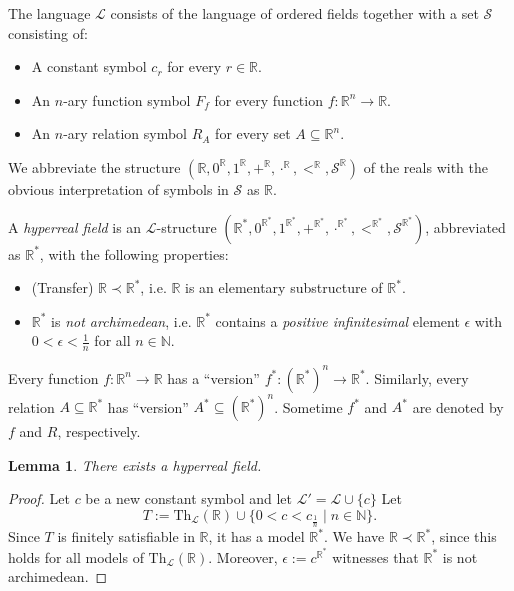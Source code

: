 \documentclass[a4paper, 11pt]{amsart}
\newtheorem{lemma}[lemma]{Lemma}
\theoremstyle{remark}
\newcommand{\NN}{\mathbb{N}}
\newcommand{\Th}{\mathrm{Th}}
\newcommand{\RR}{\mathbb{R}}
\newcommand{\cF}{\mathcal F}
\newcommand{\cL}{\mathcal L}
\newcommand{\cS}{\mathcal S}
\begin{document}

The language $\cL$ consists of the language of ordered fields together with a set $\cS$ consisting of: 

\begin{itemize} 
\item 
A constant symbol $c_r$ for every $r\in \RR$. 
\item 
An $n$-ary function symbol $F_f$ for every function $f\colon \RR^n \rightarrow \RR$. 
\item 
An $n$-ary relation symbol $R_A$ for every set $A\subseteq \RR^n$. 
\end{itemize} 

We abbreviate the structure 
$(\RR,0^{\RR},1^{\RR},+^{\RR},\cdot^{\RR},<^{\RR},\cS^{\RR})$ 
of the reals with the obvious interpretation of symbols in $\cS$ as $\RR$. 

A \emph{hyperreal field} is an $\cL$-structure $(\RR^*,0^{\RR^*},1^{\RR^*},+^{\RR^*},\cdot^{\RR^*},<^{\RR^*},\cS^{\RR^*})$, abbreviated as $\RR^*$, with the following properties: 

\begin{itemize} 
\item 
(Transfer) 
$\RR \prec \RR^*$, i.e. $\RR$ is an elementary substructure of $\RR^*$. 
\item 
$\RR^*$ is \emph{not archimedean}, i.e. $\RR^*$ contains a \emph{positive infinitesimal} element $\epsilon$ with $0<\epsilon < \frac{1}{n}$ for all $n\in\NN$. 
\end{itemize} 

Every function $f\colon \RR^n\rightarrow \RR$ has a ``version'' $f^*\colon (\RR^*)^n \rightarrow \RR^*$. Similarly, every relation $A\subseteq \RR^*$ has  ``version'' $A^*\subseteq (\RR^*)^n$. 
Sometime $f^*$ and $A^*$ are denoted by $f$ and $R$, respectively.  


\begin{lemma} 
There exists a hyperreal field. 
\end{lemma} 
\begin{proof} 
Let $c$ be a new constant symbol and let $\cL'=\cL\cup\{c\}$ 
Let 
$$ T:=   \Th_\cL(\RR)\cup \{ 0<c< c_{\frac{1}{n}} \mid  n\in\NN \}. $$ 
Since $T$ is finitely satisfiable in $\RR$, it has a model $\RR^*$. 
We have $\RR\prec \RR^*$, since this holds for all models of $\Th_\cL(\RR)$. 
Moreover, $\epsilon:=c^{\RR^*}$ witnesses that $\RR^*$ is not archimedean. 
\end{proof} 
\end{document}
